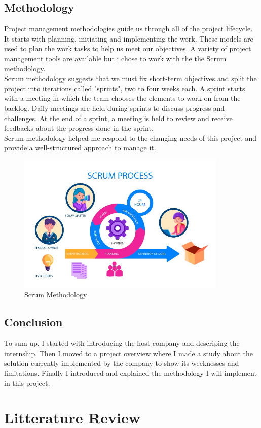 \documentclass[11pt, a4paper]{report}
\begin{document}
      \section{Methodology}
        Project management methodologies guide us through all of the project lifecycle. It starts with planning, initiating and implementing the work. These models are used to plan the work tasks to help us meet our objectives. A variety of project management tools are available but i chose to work with the the Scrum methodology.\\
        Scrum methodology suggests that we must fix short-term objectives and split the project into iterations called "sprints", two to four weeks each. A sprint starts with a meeting in which the team chooses the elements to work on from the backlog. Daily meetings are held during sprints to discuss progress and challenges. At the end of a sprint, a meeting is held to review and receive feedbacks about the progress done in the sprint.\\
        Scrum methodology helped me respond to the changing needs of this project and provide a well-structured approach to manage it. 
        \begin{figure}[h]
          \centering
          \includegraphics[width=10cm]{Images/scrum.jpg}
          \caption{Scrum Methodology}        
        \end{figure}
        \section{Conclusion}
          To sum up, I started with introducing the host company and descriping the internship. Then I moved to a project overview where I made a study about the solution currently implemented by the company to show its weeknesses and limitations. Finally I introduced and explained the methodology I will implement in this project.
          
    
    
    \newpage 
        \chapter{Litterature Review}






















  
\end{document}
